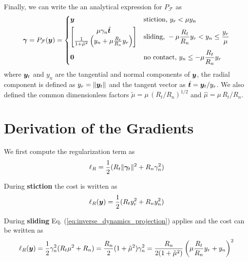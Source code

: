 Finally, we can write the an analytical expression for $P_\mathcal{F}$ as
\begin{equation}
	\bgamma = P_\mathcal{F}(\vf{y}) = 
\begin{dcases}
	\vf{y} 
	& \text{stiction, } y_r < \mu y_n\\
	\begin{bmatrix}
		\mu\gamma_n\hat{\vf{t}}\\
		\frac{1}{1+\tilde\mu^2}\left(y_n +
	\mu\frac{R_t}{R_n}y_r\right)
	\end{bmatrix}
	& \text{sliding, } -\mu \frac{R_t}{R_n} y_r < y_n \leq \frac{y_r}{\mu}\\
    \vf{0} & \text{no contact, } y_n \leq -\mu \frac{R_t}{R_n} y_r
\end{dcases}	  
	\label{eq:inverse_dynamics_projection}
\end{equation}
where ${\bm{y}}_t$ and $y_n$ are the tangential and normal components of ${\bm{y}}$,
the radial component is defined as $y_r=\Vert{\bm{y}}_t\Vert$ and the tangent
vector as $\hat{{\bm{t}}}={\bm{y}}_t/y_r$. We also defined the common dimensionless
factors $\tilde\mu=\mu\,(R_t/R_n)^{1/2}$ and $\hat\mu=\mu\,R_t/R_n$.




\section{Derivation of the Gradients}
\label{app:gradients_derivation}

We first compute the regularization term as
\begin{eqnarray}
	\ell_R = \frac{1}{2}(R_t\Vert{\bm\gamma}_t\Vert^2+R_n\gamma_n^2)
\end{eqnarray}

During \textbf{stiction} the cost is written as
\begin{eqnarray}
	\ell_R({\bm{y}}) = \frac{1}{2}(R_t y_r^2+R_n y_n^2)
\end{eqnarray}

During \textbf{sliding} Eq. (\ref{eq:inverse_dynamics_projection}) applies and
the cost can be written as
\begin{eqnarray}
	\ell_R({\bm{y}}) =
	\frac{1}{2}\gamma_n^2(R_t\mu^2+R_n)=\frac{R_n}{2}(1+\tilde\mu^2)\gamma_n^2=\frac{R_n}{2(1+\tilde\mu^2)}\left(\mu\frac{R_t}{R_n}y_r+y_n\right)^2
\end{eqnarray}

